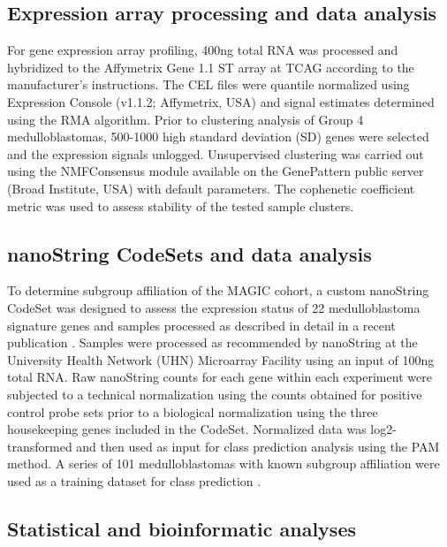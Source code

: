 \subsection{Expression array processing and data analysis}

For gene expression array profiling, 400ng total RNA was processed and hybridized to the Affymetrix Gene 1.1 ST array at TCAG according to the manufacturer’s instructions. The CEL files were quantile normalized using Expression Console (v1.1.2; Affymetrix, USA) and signal estimates determined using the RMA algorithm.  Prior to clustering analysis of Group 4 medulloblastomas, 500-1000 high standard deviation (SD) genes were selected and the expression signals unlogged.  Unsupervised clustering was carried out using the NMFConsensus module available on the GenePattern public server (Broad Institute, USA) with default parameters.  The cophenetic coefficient metric was used to assess stability of the tested sample clusters.

\subsection{nanoString CodeSets and data analysis}

To determine subgroup affiliation of the MAGIC cohort, a custom nanoString CodeSet was designed to assess the expression status of 22 medulloblastoma signature genes and samples processed as described in detail in a recent publication .  Samples were processed as recommended by nanoString at the University Health Network (UHN) Microarray Facility using an input of 100ng total RNA.  Raw nanoString counts for each gene within each experiment were subjected to a technical normalization using the counts obtained for positive control probe sets prior to a biological normalization using the three housekeeping genes included in the CodeSet. Normalized data was log2-transformed and then used as input for class prediction analysis using the PAM method.  A series of 101 medulloblastomas with known subgroup affiliation were used as a training dataset for class prediction .

\subsection{Statistical and bioinformatic analyses}

